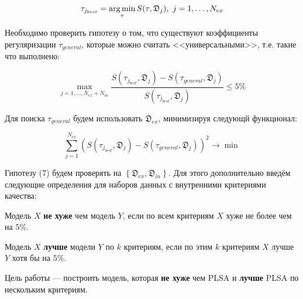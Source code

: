 \documentclass[12pt,twoside]{article}
\begin{document}
\begin{equation}
\tau_{j_{best}} = \argmin_{\tau} S(\tau, \mathfrak{D}_j) ,\ j = 1,\dots , N_{ex}
\end{equation}

Необходимо проверить гипотезу о том, что существуют коэффициенты регуляризации $\tau_{general}$, которые можно считать <<универсальными>>, т.е. такие что выполнено:

\begin{equation}
\max_{j=1,\dots,N_{ex}+N_{in}} \frac{S(\tau_{j_{best}}, \mathfrak{D}_j)- S(\tau_{general}, \mathfrak{D}_j)}{S(\tau_{j_{best}}, \mathfrak{D}_j)} \leq 5\%
\end{equation}

Для поиска $\tau_{general}$ будем использовать $\mathfrak{D}_{ex}$, минимизируя следующй функционал:

\begin{equation}
\sum_{j=1}^{N_{ex}} \left(S(\tau_{j_{best}}, \mathfrak{D}_j)- S(\tau_{general}, \mathfrak{D}_j)\right)^2 \to \min
\end{equation}

Гипотезу (7) будем проверять на $\left\{\mathfrak{D}_{ex}, \mathfrak{D}_{in}\right\}$. Для этого дополнительно введём следующие определения для наборов данных с внутренними критериями качества:

\begin{Def}
Модель $X$ {\bf не хуже} чем модель $Y$, если по всем критериям $X$ хуже не более чем на $5\%$.
\end{Def}

\begin{Def}
	Модель $X$ {\bf лучше} модели $Y$ по $k$ критериям, если по этим $k$ критериям $X$ лучше $Y$ хотя бы на $5\%$.
\end{Def}

Цель работы --- построить модель, которая {\bf не хуже} чем PLSA\cite{Hofmann:1999:PLS:2073796.2073829} и {\bf лучше} PLSA по нескольким критериям.


%
%
\end{document}
